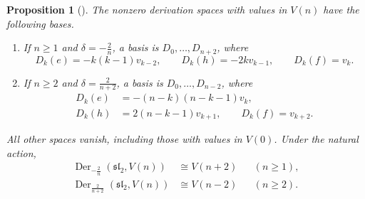 \documentclass[11pt,reqno]{amsart}
\numberwithin{equation}{section}
\newcommand{\s}{\mathfrak{sl}_2}
\DeclareMathOperator{\Der}{Der}
\newtheorem{proposition}[theorem]{Proposition}
\theoremstyle{definition}
\theoremstyle{remark}
\begin{document}
\begin{proposition}[{\cite[Lemma~9(ii),(iii)]{ZZ21}}]\label{prop:finite}
The nonzero derivation spaces with values in \(V(n)\) have the following bases.
\begin{enumerate}
\item If \(n\ge1\) and \(\delta=-\frac{2}{n}\), a basis is
\(D_0,\ldots,D_{n+2}\), where
\begin{equation}\label{eq:lower-basis}
D_k(e)=-k(k-1)v_{k-2},\qquad
D_k(h)=-2kv_{k-1},\qquad D_k(f)=v_k.
\end{equation}
\item If \(n\ge2\) and \(\delta=\frac{2}{n+2}\), a basis is
\(D_0,\ldots,D_{n-2}\), where
\begin{equation}\label{eq:upper-basis}
\begin{aligned}
D_k(e)&=-(n-k)(n-k-1)v_k,\\
D_k(h)&=2(n-k-1)v_{k+1},\qquad D_k(f)=v_{k+2}.
\end{aligned}
\end{equation}
\end{enumerate}
All other spaces vanish, including those with values in
\(V(0)\). Under the natural action,
\begin{equation}\label{eq:finite-table}
\begin{aligned}
\Der_{-\frac{2}{n}}(\s,V(n))&\cong V(n+2) &&(n\ge1),\\
\Der_{\frac{2}{n+2}}(\s,V(n))&\cong V(n-2) &&(n\ge2).
\end{aligned}
\end{equation}
\end{proposition}
\end{document}
